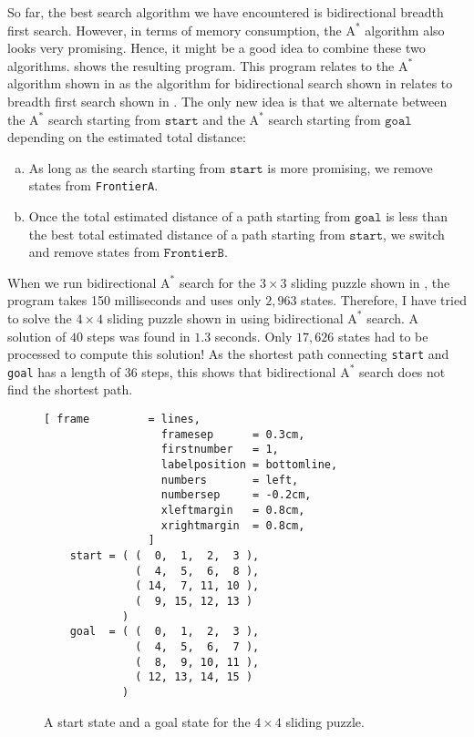 \noindent
So far, the best search algorithm we have encountered is bidirectional breadth first search.  However, in terms
of memory consumption, the $\mathrm{A}^*$ algorithm also looks very promising.  Hence, it might be a good idea
to combine these two algorithms.   shows the resulting program.  This program
relates to the $\mathrm{A}^*$ algorithm shown in  as the algorithm for bidirectional
search shown in  relates to breadth first search shown in .
The only new idea is that we alternate between the $\mathrm{A}^*$ search starting from $\texttt{start}$ and the
$\mathrm{A}^*$ search starting from $\texttt{goal}$ depending on the estimated total distance:
\begin{enumerate}[(a)]
\item As long as the search starting from $\texttt{start}$ is more promising, we remove states from
      \texttt{FrontierA}.
\item Once the total estimated distance of a path starting from $\texttt{goal}$ is less than the best total
      estimated distance of a path starting from $\texttt{start}$, we switch and remove states from $\texttt{FrontierB}$.
\end{enumerate}
When we run bidirectional $\mathrm{A}^*$ search for the $3 \times 3$ sliding puzzle shown in
, the program takes 150 milliseconds and uses only $2,963$ states.  Therefore, I have tried
to solve the $4 \times 4$ sliding puzzle shown in  using
bidirectional $\mathrm{A}^*$ search.  A solution of $40$ steps was found in $1.3$ seconds.
Only $17,626$ states had to be processed to compute this solution!  As the shortest path connecting
\texttt{start} and \texttt{goal} has a length of 36 steps, this shows that bidirectional $\mathrm{A}^*$ search
does not find the shortest path.



\begin{figure}[!ht]
\centering
\begin{Verbatim}[ frame         = lines,
                  framesep      = 0.3cm,
                  firstnumber   = 1,
                  labelposition = bottomline,
                  numbers       = left,
                  numbersep     = -0.2cm,
                  xleftmargin   = 0.8cm,
                  xrightmargin  = 0.8cm,
                ]
    start = ( (  0,  1,  2,  3 ),
              (  4,  5,  6,  8 ),
              ( 14,  7, 11, 10 ),
              (  9, 15, 12, 13 )
            )
    goal  = ( (  0,  1,  2,  3 ),
              (  4,  5,  6,  7 ),
              (  8,  9, 10, 11 ),
              ( 12, 13, 14, 15 )
            )
\end{Verbatim}
\vspace*{-0.3cm}
\caption{A start state and a goal state for the $4 \times 4$ sliding puzzle.}
\label{fig:start-goal.stlx}
\end{figure}


